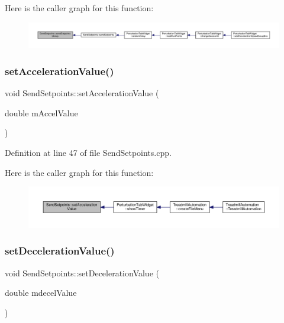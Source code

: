 Here is the caller graph for this function\+:
\nopagebreak
\begin{figure}[H]
\begin{center}
\leavevmode
\includegraphics[width=350pt]{class_send_setpoints_a8a8b8a1dbc121419b3708f359285394d_icgraph}
\end{center}
\end{figure}
\mbox{\label{class_send_setpoints_a35658d55d1dd98b53515c07eebc107a1}} 
\subsubsection{\texorpdfstring{set\+Acceleration\+Value()}{setAccelerationValue()}}
{\footnotesize\ttfamily void Send\+Setpoints\+::set\+Acceleration\+Value (\begin{DoxyParamCaption}\item[{double}]{m\+Accel\+Value }\end{DoxyParamCaption})}



Definition at line 47 of file Send\+Setpoints.\+cpp.

Here is the caller graph for this function\+:
\nopagebreak
\begin{figure}[H]
\begin{center}
\leavevmode
\includegraphics[width=350pt]{class_send_setpoints_a35658d55d1dd98b53515c07eebc107a1_icgraph}
\end{center}
\end{figure}
\mbox{\label{class_send_setpoints_a5993c64b755726a1b618fba58537aee6}} 
\subsubsection{\texorpdfstring{set\+Deceleration\+Value()}{setDecelerationValue()}}
{\footnotesize\ttfamily void Send\+Setpoints\+::set\+Deceleration\+Value (\begin{DoxyParamCaption}\item[{double}]{mdecel\+Value }\end{DoxyParamCaption})}




